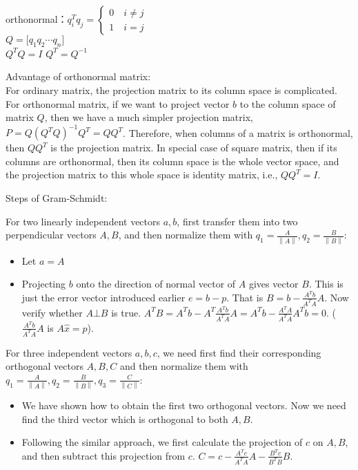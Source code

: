 \documentclass[11pt]{article}
\providecommand{\tightlist}{%
      \setlength{\itemsep}{0pt}\setlength{\parskip}{0pt}}
\begin{document}
orthonormal：\(q_i^Tq_j=\begin{cases}0\quad i\neq j\\1\quad i=j\end{cases}\)\\
\(Q=\Bigg[q_1 q_2 \cdots q_n\Bigg]\)\\
\(Q^TQ=I\) \(Q^T=Q^{-1}\)

Advantage of orthonormal matrix:\\
For ordinary matrix, the projection matrix to its column space is
complicated. For orthonormal matrix, if we want to project vector \(b\)
to the column space of matrix \(Q\), then we have a much simpler
projection matrix, \(P=Q(Q^TQ)^{-1}Q^T = QQ^T\). Therefore, when columns
of a matrix is orthonormal, then \(QQ^T\) is the projection matrix. In
special case of square matrix, then if its columns are orthonormal, then
its column space is the whole vector space, and the projection matrix to
this whole space is identity matrix, i.e., \(QQ^T=I\).

Steps of Gram-Schmidt:

For two linearly independent vectors \(a, b\), first transfer them into
two perpendicular vectors \(A, B\), and then normalize them with
\(q_1=\frac{A}{\left\|A\right\|}, q_2=\frac{B}{\left\|B\right\|}\):

\begin{itemize}
\tightlist
\item
  Let \(a=A\)\\
\item
  Projecting \(b\) onto the direction of normal vector of \(A\) gives
  vector \(B\). This is just the error vector introduced earlier
  \(e=b-p\). That is \(B=b-\frac{A^Tb}{A^TA}A\). Now verify whether
  \(A\bot B\) is true.
  \(A^TB=A^Tb-A^T\frac{A^Tb}{A^TA}A=A^Tb-\frac{A^TA}{A^TA}A^Tb=0\).
  (\(\frac{A^Tb}{A^TA}A\) is \(A\hat x=p\)).
\end{itemize}

For three independent vectors \(a, b, c\), we need first find their
corresponding orthogonal vectors \(A, B, C\) and then normalize them
with
\(q_1=\frac{A}{\left\|A\right\|}, q_2=\frac{B}{\left\|B\right\|}, q_3=\frac{C}{\left\|C\right\|}\):

\begin{itemize}
\tightlist
\item
  We have shown how to obtain the first two orthogonal vectors. Now we
  need find the third vector which is orthogonal to both \(A, B\).\\
\item
  Following the similar approach, we first calculate the projection of
  \(c\) on \(A, B\), and then subtract this projection from \(c\).
  \(C=c-\frac{A^Tc}{A^TA}A-\frac{B^Tc}{B^TB}B\).
\end{itemize}
\end{document}
